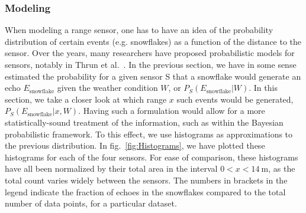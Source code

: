 \subsubsection{Modeling}
When modeling a range sensor, one has to have an idea of the probability distribution of certain events (e.g. snowflakes) as a function of the distance to the sensor. Over the years, many researchers have proposed probabilistic models for sensors, notably in Thrun et al.~\cite{Thrun:2005:PR:1121596}. In the previous section, we have in some sense estimated the probability for a given sensor S that a snowflake would generate an echo $E_\text{snowflake}$ given the weather condition $W$, or $P_S(E_\text{snowflake}|W)$. In this section, we take a closer look at which range $x$ such events would be generated, $P_S(E_\text{snowflake}|x,W)$. Having such a formulation would allow for a more statistically-sound treatment of the information, such as within the Bayesian probabilistic framework. To this effect, we use histograms as approximations to the previous distribution. In fig.~\ref{fig:Histograms}, we have plotted these histograms for each of the four sensors. For ease of comparison, these histograms have all been normalized by their total area in the interval $0 < x < \SI{14}{\meter}$, as the total count varies widely between the sensors. The numbers in brackets in the legend indicate the fraction of echoes in the snowflakes compared to the total number of data points, for a particular dataset.


